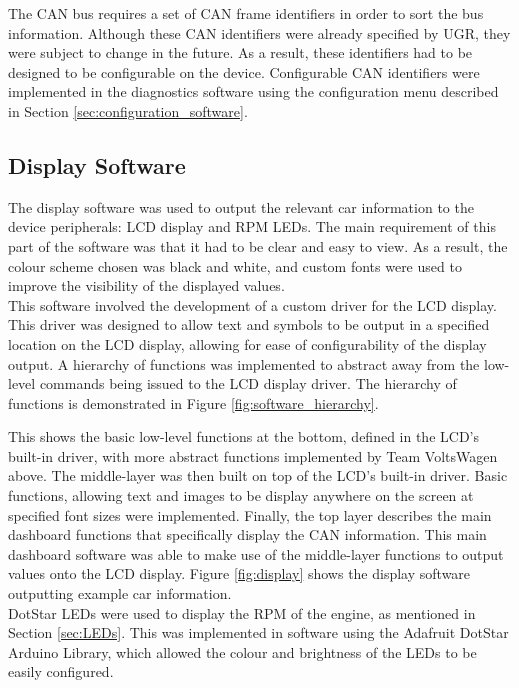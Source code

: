 \documentclass[a4paper,12pt]{article}
\begin{document}
The CAN bus requires a set of CAN frame identifiers in order to sort the bus information. Although these CAN identifiers were already specified by UGR, they were subject to change in the future. As a result, these identifiers had to be designed to be configurable on the device. Configurable CAN identifiers were implemented in the diagnostics software using the configuration menu described in Section \ref{sec:configuration_software}.

\subsection{Display Software}
\label{sec:display_software}

The display software was used to output the relevant car information to the device peripherals: LCD display and RPM LEDs. The main requirement of this part of the software was that it had to be clear and easy to view. As a result, the colour scheme chosen was black and white, and custom fonts were used to improve the visibility of the displayed values. \\

This software involved the development of a custom driver for the LCD display. This driver was designed to allow text and symbols to be output in a specified location on the LCD display, allowing for ease of configurability of the display output. A hierarchy of functions was implemented to abstract away from the low-level commands being issued to the LCD display driver. The hierarchy of functions is demonstrated in Figure \ref{fig:software_hierarchy}. 



This shows the basic low-level functions at the bottom, defined in the LCD's built-in driver, with more abstract functions implemented by Team VoltsWagen above. The middle-layer was then built on top of the LCD's built-in driver. Basic functions, allowing text and images to be display anywhere on the screen at specified font sizes were implemented. Finally, the top layer describes the main dashboard functions that specifically display the CAN information. This main dashboard software was able to make use of the middle-layer functions to output values onto the LCD display. Figure \ref{fig:display} shows the display software outputting example car information. \\



DotStar LEDs were used to display the RPM of the engine, as mentioned in Section \ref{sec:LEDs}. This was implemented in software using the Adafruit DotStar Arduino Library, which allowed the colour and brightness of the LEDs to be easily configured.
\end{document}
